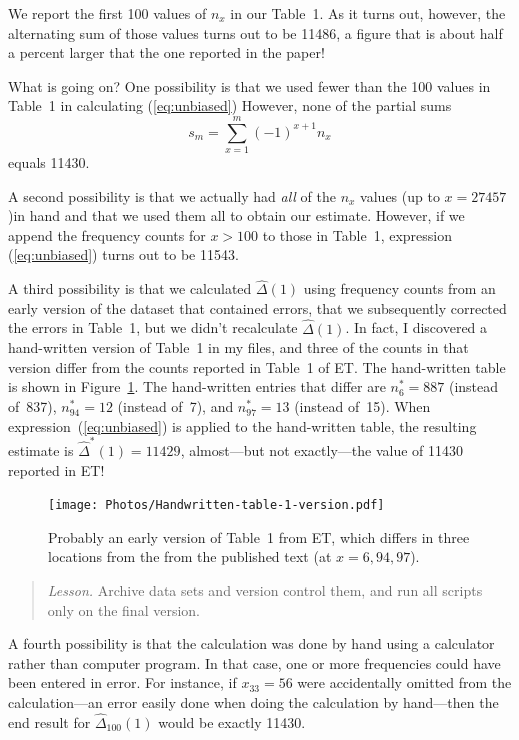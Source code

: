 \documentclass[
  letterpaper, %
  11pt, %
  oneside,  %
  onecolumn,  %
  openany,  %
  article
]{memoir}
\begin{document}
We report the first 100 values of $n_x$ in our Table~1. As it turns out, however, the alternating sum of those values turns out to be 11486, a figure that is about half a percent larger that the one reported in the paper!

What is going on?  One possibility is that we used fewer than the 100 values in Table~1 in calculating (\ref{eq:unbiased})  However, none of the partial sums
$$
s_m=\sum_{x=1}^m (-1)^{x+1} n_x$$
equals 11430.  

A second possibility is that we actually had \textit{all} of the $n_x$ values (up to $x=27457$)in hand and that we used them all to obtain our estimate.  However, if we append the frequency counts for $x>100$ to those in Table~1, expression (\ref{eq:unbiased}) turns out to be 11543.

A third possibility is that we calculated $\hat\Delta(1)$ using frequency counts from an early version of the dataset that contained errors, that we subsequently corrected the errors in Table~1, but we didn't recalculate $\hat\Delta(1)$.  In fact, I discovered a hand-written version of Table~1 in my files, and three of the counts in that version differ from the counts reported in Table~1 of ET.  The hand-written table is shown in Figure~\ref{fig:hand-Table1}.  The hand-written entries that differ are $n^*_6=887$ (instead of~837), $n^*_{94}=12$ (instead of~7), and $n^*_{97}=13$ (instead of~15).  When expression~(\ref{eq:unbiased}) is applied to the hand-written table, the resulting estimate is $\hat\Delta^*(1) = 11429$, almost---but not exactly---the value of 11430 reported in ET!

\begin{figure}
	\centering
	\texttt{[image: Photos/Handwritten-table-1-version.pdf]}
	\caption{Probably an early version of Table~1 from ET, which differs in three locations from the from the published text (at $x=6, 94, 97$).}
	\label{fig:hand-Table1}
\end{figure}

\begin{quotation}
	\textit{Lesson.}  Archive data sets and version control them, and run all scripts only on the final version.
\end{quotation}

A fourth possibility is that the calculation was done by hand using a calculator rather than computer program.  In that case, one or more frequencies could have been entered in error.  For instance, if $x_{33}=56$ were accidentally omitted from the calculation---an error easily done when doing the calculation by hand---then the end result for $\hat\Delta_{100}(1)$ would be exactly 11430.
\end{document}
